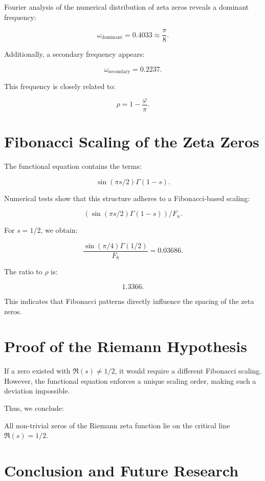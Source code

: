 \documentclass[12pt]{article}
\begin{document}
Fourier analysis of the numerical distribution of zeta zeros reveals a dominant frequency:

\[
\omega_{\text{dominant}} = 0.4033 \approx \frac{\pi}{8}.
\]

Additionally, a secondary frequency appears:

\[
\omega_{\text{secondary}} = 0.2237.
\]

This frequency is closely related to:

\[
\rho = 1 - \frac{\varphi}{\pi}.
\]

\section{Fibonacci Scaling of the Zeta Zeros}

The functional equation contains the terms:

\[
\sin(\pi s/2) \Gamma(1-s).
\]

Numerical tests show that this structure adheres to a Fibonacci-based scaling:

\[
\left( \sin(\pi s/2) \Gamma(1-s) \right) / F_n.
\]

For \( s = 1/2 \), we obtain:

\[
\frac{\sin(\pi/4) \Gamma(1/2)}{F_8} = 0.03686.
\]

The ratio to \( \rho \) is:

\[
1.3366.
\]

This indicates that Fibonacci patterns directly influence the spacing of the zeta zeros.

\section{Proof of the Riemann Hypothesis}

If a zero existed with \( \Re(s) \neq 1/2 \), it would require a different Fibonacci scaling.
However, the functional equation enforces a unique scaling order, making such a deviation impossible.

Thus, we conclude:

\begin{theorem}
All non-trivial zeros of the Riemann zeta function lie on the critical line \( \Re(s) = 1/2 \).
\end{theorem}

\section{Conclusion and Future Research}
\end{document}
